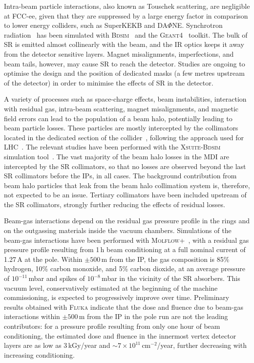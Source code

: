 Intra-beam particle interactions, also known as Touschek scattering, are negligible at FCC-ee, 
given that they are suppressed by a large energy factor in comparison to lower energy colliders, 
such as SuperKEKB and DA$\Phi$NE. 
Synchrotron radiation~\cite{Andre:2024bfm} has been simulated with \textsc{Bdsim}~\cite{Nevay} and the \textsc{Geant4}~\cite{Allison} toolkit. 
The bulk of SR is emitted almost collinearly with the beam, 
and the IR optics keeps it away from the detector sensitive layers. 
Magnet misalignments, imperfections, and beam tails, however, may cause SR to reach the detector. 
Studies are ongoing to optimise the design and the position of dedicated masks 
(a few metres upstream of the detector) 
in order to minimise the effects of SR in the detector.

A variety of processes such as space-charge effects, beam instabilities, interaction with residual gas, 
intra-beam scattering, magnet misalignments, and magnetic field errors can lead to the population of a beam halo, 
potentially leading to beam particle losses.
These particles are mostly intercepted by the collimators located in the dedicated section of the collider~\cite{FCC-PED-FSR-Vol2}, 
following the approach used for LHC~\cite{bruce2014simulations}.  
The relevant studies have been performed with the \textsc{Xsuite-Bdsim} simulation tool~\cite{Abramov:2024uas,Broggi:2024ocw}.
The vast majority of the beam halo losses in the MDI are intercepted by the SR collimators,
so that no losses are observed beyond the last SR collimators before the IPs, in all cases.
The background contribution from beam halo particles that leak from the beam halo collimation system is,
therefore, not expected to be an issue. 
Tertiary collimators have been included upstream of the SR collimators, 
strongly further reducing the effects of residual losses.

Beam-gas interactions depend on the residual gas pressure profile in the rings and on the outgassing materials inside the vacuum chambers. 
Simulations of the beam-gas interactions have been performed with \textsc{Molflow+}~\cite{Kersevan:IPAC2019-TUPMP037}, 
with a residual gas pressure profile resulting from 1\,h beam conditioning at a full nominal current of 1.27\,A at the \PZ pole. 
Within $\pm 500$\,m from the IP, 
the gas composition is 85\% hydrogen, 10\% carbon monoxide, and 5\% carbon dioxide, 
at an average pressure of $10^{-11}$\,mbar and spikes of $10^{-8}$\,mbar in the vicinity of the SR absorbers. 
This vacuum level, conservatively estimated at the beginning of the machine commissioning, is expected to progressively improve over time. 
Preliminary results obtained with \textsc{Fluka} indicate that the dose and fluence due to beam-gas interactions within $\pm 500$\,m from the IP
in the \PZ pole run are not the leading contributors: 
for a pressure profile resulting from only one hour of beam conditioning, 
the estimated dose and fluence in the innermost vertex detector layers are as low as 3\,kGy/year 
and $\sim 7 \times 10^{11}$\,cm$^{-2}$/year, further decreasing with increasing conditioning.

